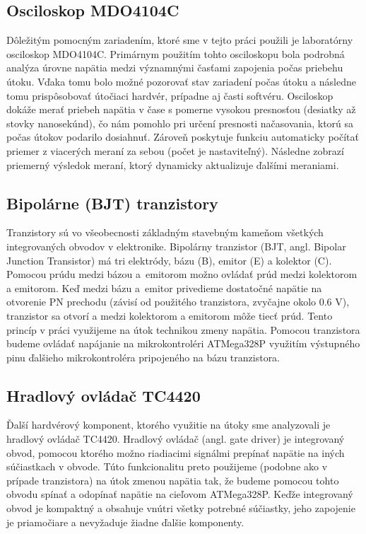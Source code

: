 \subsection{Osciloskop MDO4104C} \label{kap2:sek:osciloskop}
Dôležitým pomocným zariadením, ktoré sme v tejto práci použili je laboratórny osciloskop MDO4104C. Primárnym použitím tohto osciloskopu bola podrobná analýza úrovne napätia medzi významnými časťami zapojenia počas priebehu útoku. Vďaka tomu bolo možné pozorovať stav zariadení počas útoku a následne tomu prispôsobovať útočiaci hardvér, prípadne aj časti softvéru. Osciloskop dokáže merať priebeh napätia v čase s pomerne vysokou presnosťou (desiatky až stovky nanosekúnd), čo nám pomohlo pri určení presnosti načasovania, ktorú sa počas útokov podarilo dosiahnuť. Zároveň poskytuje funkciu automaticky počítať priemer z viacerých meraní za sebou (počet je nastaviteľný). Následne zobrazí priemerný výsledok meraní, ktorý dynamicky aktualizuje ďalšími meraniami.

\subsection{Bipolárne (BJT) tranzistory}
Tranzistory sú vo všeobecnosti základným stavebným kameňom všetkých integrovaných obvodov v elektronike. Bipolárny tranzistor (BJT, angl. Bipolar Junction Transistor) má tri elektródy, bázu (B), emitor (E) a kolektor (C). Pomocou prúdu medzi bázou a~emitorom možno ovládať prúd medzi kolektorom a emitorom. Keď medzi bázu a~emitor privedieme dostatočné napätie na otvorenie PN prechodu (závisí od použitého tranzistora, zvyčajne okolo 0.6 V), tranzistor sa otvorí a medzi kolektorom a emitorom môže tiecť prúd. Tento princíp v práci využijeme na útok technikou zmeny napätia. Pomocou tranzistora budeme ovládať napájanie na mikrokontroléri ATMega328P využitím výstupného pinu ďalšieho mikrokontroléra pripojeného na bázu tranzistora.

\subsection{Hradlový ovládač TC4420} \label{kap2:sek:hradlovyOvladac}
Ďalší hardvérový komponent, ktorého využitie na útoky sme analyzovali je hradlový ovládač TC4420. Hradlový ovládač (angl. gate driver) je integrovaný obvod, pomocou ktorého možno riadiacimi signálmi prepínať napätie na iných súčiastkach v obvode. Túto funkcionalitu preto použijeme (podobne ako v prípade tranzistora) na útok zmenou napätia tak, že budeme pomocou tohto obvodu spínať a odopínať napätie na cieľovom ATMega328P. Keďže integrovaný obvod je kompaktný a obsahuje vnútri všetky potrebné súčiastky, jeho zapojenie je priamočiare a nevyžaduje žiadne ďalšie komponenty.
